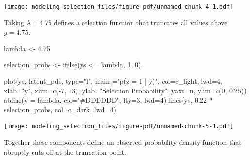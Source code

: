 \documentclass[
  letterpaper,
  DIV=11,
  numbers=noendperiod]{scrartcl}
\newenvironment{Shaded}{\begin{snugshade}}{\end{snugshade}}
\newcommand{\AttributeTok}[1]{\textcolor[rgb]{0.40,0.45,0.13}{#1}}
\newcommand{\DecValTok}[1]{\textcolor[rgb]{0.68,0.00,0.00}{#1}}
\newcommand{\FloatTok}[1]{\textcolor[rgb]{0.68,0.00,0.00}{#1}}
\newcommand{\FunctionTok}[1]{\textcolor[rgb]{0.28,0.35,0.67}{#1}}
\newcommand{\NormalTok}[1]{\textcolor[rgb]{0.00,0.23,0.31}{#1}}
\newcommand{\OtherTok}[1]{\textcolor[rgb]{0.00,0.23,0.31}{#1}}
\newcommand{\SpecialCharTok}[1]{\textcolor[rgb]{0.37,0.37,0.37}{#1}}
\newcommand{\StringTok}[1]{\textcolor[rgb]{0.13,0.47,0.30}{#1}}
\begin{document}
\texttt{[image: modeling\_selection\_files/figure-pdf/unnamed-chunk-4-1.pdf]}

Taking \(\lambda = 4.75\) defines a selection function that truncates
all values above \(y = 4.75\).

\begin{Shaded}
\begin{Highlighting}[]
\NormalTok{lambda }\OtherTok{\textless{}{-}} \FloatTok{4.75}

\NormalTok{selection\_probs }\OtherTok{\textless{}{-}} \FunctionTok{ifelse}\NormalTok{(ys }\SpecialCharTok{\textless{}=}\NormalTok{ lambda, }\DecValTok{1}\NormalTok{, }\DecValTok{0}\NormalTok{)}

\FunctionTok{plot}\NormalTok{(ys, latent\_pds, }\AttributeTok{type=}\StringTok{"l"}\NormalTok{, }\AttributeTok{main =}\StringTok{"p(z = 1 | y)"}\NormalTok{, }\AttributeTok{col=}\NormalTok{c\_light, }\AttributeTok{lwd=}\DecValTok{4}\NormalTok{,}
     \AttributeTok{xlab=}\StringTok{"y"}\NormalTok{, }\AttributeTok{xlim=}\FunctionTok{c}\NormalTok{(}\SpecialCharTok{{-}}\DecValTok{7}\NormalTok{, }\DecValTok{13}\NormalTok{),}
     \AttributeTok{ylab=}\StringTok{"Selection Probability"}\NormalTok{, }\AttributeTok{yaxt=}\StringTok{\textquotesingle{}n\textquotesingle{}}\NormalTok{, }\AttributeTok{ylim=}\FunctionTok{c}\NormalTok{(}\DecValTok{0}\NormalTok{, }\FloatTok{0.25}\NormalTok{))}
\FunctionTok{abline}\NormalTok{(}\AttributeTok{v =}\NormalTok{ lambda, }\AttributeTok{col=}\StringTok{"\#DDDDDD"}\NormalTok{, }\AttributeTok{lty=}\DecValTok{3}\NormalTok{, }\AttributeTok{lwd=}\DecValTok{4}\NormalTok{)}
\FunctionTok{lines}\NormalTok{(ys, }\FloatTok{0.22} \SpecialCharTok{*}\NormalTok{ selection\_probs, }\AttributeTok{col=}\NormalTok{c\_dark, }\AttributeTok{lwd=}\DecValTok{4}\NormalTok{)}
\end{Highlighting}
\end{Shaded}

\texttt{[image: modeling\_selection\_files/figure-pdf/unnamed-chunk-5-1.pdf]}

Together these components define an observed probability density
function that abruptly cuts off at the truncation point.
\end{document}
